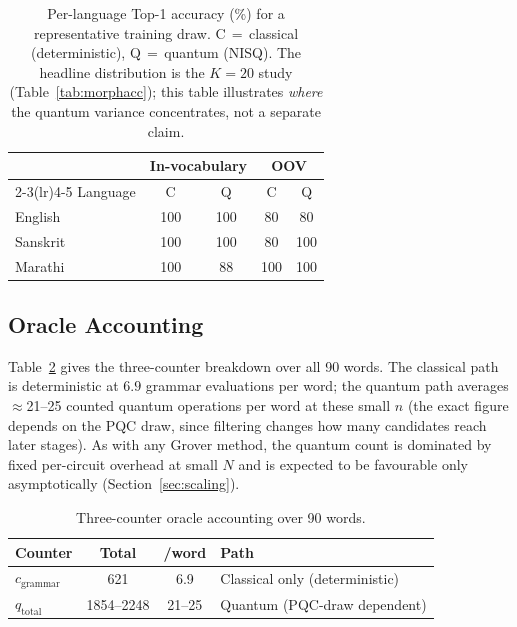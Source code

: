 \documentclass[journal]{IEEEtran}
\begin{document}
\begin{table}[t]
\centering
\caption{Per-language Top-1 accuracy (\%) for a representative training draw.
C\,$=$\,classical (deterministic), Q\,$=$\,quantum (NISQ). The headline
distribution is the $K{=}20$ study (Table~\ref{tab:morphacc}); this table
illustrates \emph{where} the quantum variance concentrates, not a separate claim.}
\label{tab:perlang}
\small
\begin{tabular}{@{}lcccc@{}}
\toprule
 & \multicolumn{2}{c}{In-vocabulary} & \multicolumn{2}{c}{OOV} \\
\cmidrule(lr){2-3}\cmidrule(lr){4-5}
Language & C & Q & C & Q \\
\midrule
English  & 100 & 100 & 80  & 80  \\
Sanskrit & 100 & 100 & 80  & 100 \\
Marathi  & 100 & 88  & 100 & 100 \\
\bottomrule
\end{tabular}
\end{table}

\subsection{Oracle Accounting}
Table~\ref{tab:accounting} gives the three-counter breakdown over all 90 words.
The classical path is deterministic at $6.9$ grammar evaluations per word; the
quantum path averages $\approx$21--25 counted quantum operations per word at
these small $n$ (the exact figure depends on the PQC draw, since filtering
changes how many candidates reach later stages). As with any Grover method, the
quantum count is dominated by fixed per-circuit overhead at small $N$ and is
expected to be favourable only asymptotically (Section~\ref{sec:scaling}).

\begin{table}[t]
\centering
\caption{Three-counter oracle accounting over 90 words.}
\label{tab:accounting}
\small
\begin{tabular}{@{}lccl@{}}
\toprule
Counter & Total & /word & Path \\
\midrule
$c_{\mathrm{grammar}}$ & 621 & 6.9 & Classical only (deterministic) \\
$q_{\mathrm{total}}$   & 1854--2248 & 21--25 & Quantum (PQC-draw dependent) \\
\bottomrule
\end{tabular}
\end{table}
\end{document}
